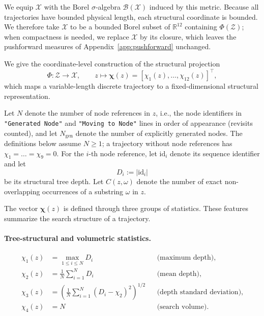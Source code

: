 We equip $\mathcal{X}$ with the Borel $\sigma$-algebra $\mathcal{B}(\mathcal{X})$ induced by this metric. Because all trajectories have bounded physical length, each structural coordinate is bounded. We therefore take $\mathcal X$ to be a bounded Borel subset of $\mathbb R^{12}$ containing $\Phi(\mathcal Z)$; when compactness is needed, we replace $\mathcal X$ by its closure, which leaves the pushforward measures of Appendix~\ref{app:pushforward} unchanged.

We give the coordinate-level construction of the structural projection
\begin{equation}
\Phi : \mathcal{Z} \to \mathcal{X}, 
\qquad
z \mapsto \boldsymbol{\chi}(z) =
[\chi_1(z),\dots,\chi_{12}(z)]^\top,
\end{equation}
which maps a variable-length discrete trajectory to a fixed-dimensional structural representation.

Let $N$ denote the number of node references in $z$, i.e., the node identifiers in \texttt{"Generated Node"} and \texttt{"Moving to Node"} lines in order of appearance (revisits counted), and let $N_{\mathrm{gen}}$ denote the number of explicitly generated nodes. The definitions below assume $N\ge 1$; a trajectory without node references has $\chi_1=\dots=\chi_9=0$. For the $i$-th node reference, let $\mathrm{id}_i$ denote its sequence identifier and let
\begin{equation}
D_i := |\mathrm{id}_i|
\end{equation}
be its structural tree depth. Let $C(z,\omega)$ denote the number of exact non-overlapping occurrences of a substring $\omega$ in $z$.

The vector $\boldsymbol{\chi}(z)$ is defined through three groups of statistics. These features summarize the search structure of a trajectory.

\paragraph{Tree-structural and volumetric statistics.}
\begin{align}
\chi_1(z) &= \max_{1 \le i \le N} D_i 
&& \text{(maximum depth)}, \\
\chi_2(z) &= \frac{1}{N}\sum_{i=1}^{N} D_i 
&& \text{(mean depth)}, \\
\chi_3(z) &= \left( \frac{1}{N}\sum_{i=1}^{N}(D_i-\chi_2)^2 \right)^{1/2}
&& \text{(depth standard deviation)}, \\
\chi_4(z) &= N
&& \text{(search volume)}.
\end{align}


